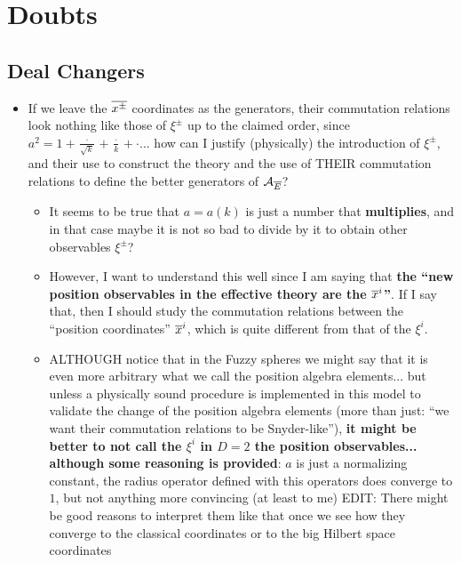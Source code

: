\section{Doubts}

\subsection{Deal Changers}

    \begin{itemize}
    
    \item If we leave the $\overline{x^\pm}$ coordinates as the generators, their commutation relations look nothing like those of $\xi^\pm$ up to the claimed order, since $a^2 = 1 + \frac{\cdot}{\sqrt{k}} + \frac{\cdot}{k} + \cdot$... how can I justify (physically) the introduction of $\xi^\pm$, and their use to construct the theory and the use of THEIR commutation relations to define the better generators of $\mathcal A_{\overline{E}}$?
    
        \begin{itemize}
            
        \item It seems to be true that $a = a(k)$ is just a number that \textbf{multiplies}, and in that case maybe it is not so bad to divide by it to obtain other observables $\xi^\pm$?
        
        \item However, I want to understand this well since I am saying that \textbf{the ``new position observables in the effective theory are the $\overline{x}^i$''}. If I say that, then I should study the commutation relations between the ``position coordinates'' $\overline{x}^i$, which is quite different from that of the $\xi^i$.
        
        \item ALTHOUGH notice that in the Fuzzy spheres we might say that it is even more arbitrary what we call the position algebra elements... but unless a physically sound procedure is implemented in this model to validate the change of the position algebra elements (more than just: ``we want their commutation relations to be Snyder-like''), \textbf{it might be better to not call the $\xi^i$ in $D = 2$ the position observables... although some reasoning is provided}: $a$ is just a normalizing constant, the radius operator defined with this operators does converge to $1$, but not anything more convincing (at least to me) EDIT: There might be good reasons to interpret them like that once we see how they converge to the classical coordinates or to the big Hilbert space coordinates
        

\end{itemize}
\end{itemize}
